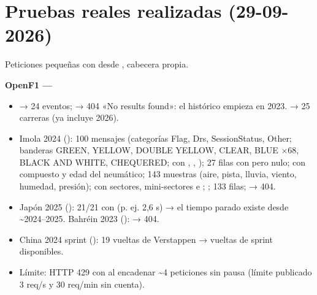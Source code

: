 \section{Pruebas reales realizadas (29-09-2026)}

Peticiones pequeñas con  desde , cabecera  propia.

\textbf{OpenF1 — }

\begin{itemize}
\item {} → 24 eventos;  → 404 «No results found»: el histórico empieza en 2023.  → 25 carreras (ya incluye 2026).
\item Imola 2024 ():  100 mensajes (categorías Flag, Drs, SessionStatus, Other; banderas GREEN, YELLOW, DOUBLE YELLOW, CLEAR, BLUE ×68, BLACK AND WHITE, CHEQUERED; con , , );  27 filas con  pero  nulo;  con compuesto y edad del neumático;  143 muestras (aire, pista, lluvia, viento, humedad, presión);  con sectores, mini-sectores e ; ;  133 filas;  → 404.
\item Japón 2025 ():  21/21 con  (p. ej. 2,6 s) → el tiempo parado existe desde \textasciitilde{}2024–2025. Bahréin 2023 ():  → 404.
\item China 2024 sprint (): 19 vueltas de Verstappen → vueltas de sprint disponibles.
\item Límite: HTTP 429 con  al encadenar \textasciitilde{}4 peticiones sin pausa (límite publicado 3 req/s y 30 req/min sin cuenta).
\end{itemize}

